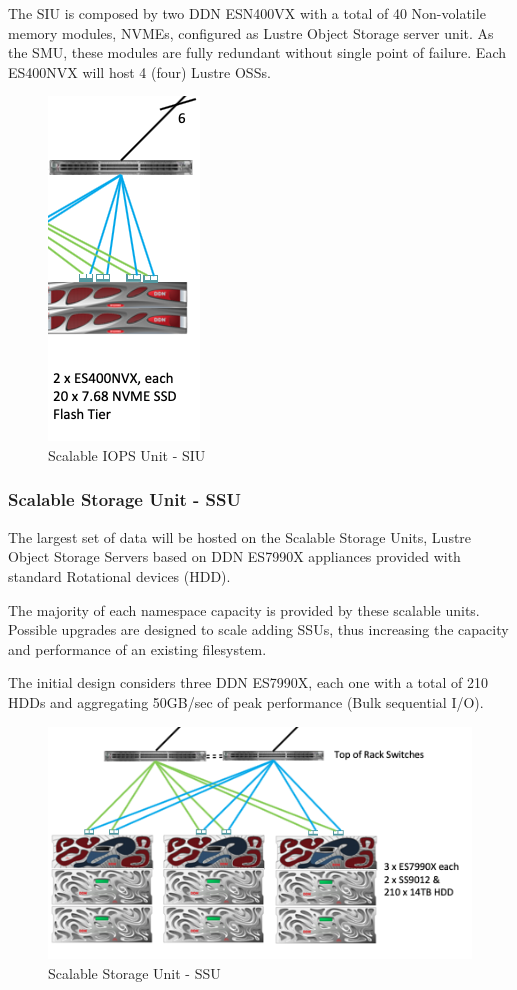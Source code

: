 \documentclass{article}
\begin{document}
The SIU is composed by two DDN ESN400VX with a total of 40 Non-volatile memory modules, NVMEs, configured as Lustre Object Storage server unit. As the SMU, these modules are fully redundant without single point of failure. Each ES400NVX will host 4 (four) Lustre OSSs. 

\begin{figure}
    \centering
    \includegraphics[scale=0.50]{SIU.png}
    \caption{Scalable IOPS Unit - SIU}
    \label{fig:SIU_block}
\end{figure}

\subsubsection{Scalable Storage Unit - SSU}
The largest set of data will be hosted on the Scalable Storage Units, Lustre Object Storage Servers based on DDN ES7990X appliances provided with standard Rotational devices (HDD). 

The majority of each namespace capacity is provided by these scalable units. Possible upgrades are designed to scale adding SSUs, thus increasing the capacity and performance of an existing filesystem.

The initial design considers three DDN ES7990X, each one with a total of 210 HDDs and aggregating 50GB/sec of peak performance (Bulk sequential I/O).

\begin{figure}
    \centering
    \includegraphics[scale=0.50]{SSU.png}
    \caption{Scalable Storage Unit - SSU}
    \label{fig:SSU_block}
\end{figure}
\end{document}

